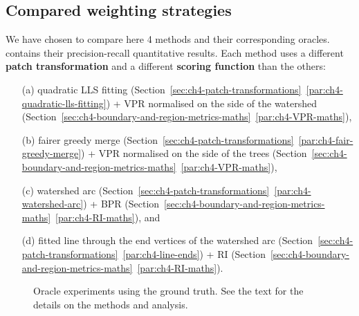 \subsection{Compared weighting strategies}
We have chosen to compare here 4 methods and their corresponding oracles.  contains their precision-recall quantitative results. Each method uses a different {\bf patch transformation} and a different {\bf scoring function} than the others: 
\begin{enumerate}
 \item[(a)] quadratic LLS fitting (Section~\ref*{sec:ch4-patch-transformations}~\ref{par:ch4-quadratic-lls-fitting}) + VPR normalised on the side of the watershed (Section~\ref*{sec:ch4-boundary-and-region-metrics-maths}~\ref{par:ch4-VPR-maths}),
 \item[(b)] fairer greedy merge (Section~\ref*{sec:ch4-patch-transformations}~\ref{par:ch4-fair-greedy-merge}) + VPR normalised on the side of the trees (Section~\ref*{sec:ch4-boundary-and-region-metrics-maths}~\ref{par:ch4-VPR-maths}),
 \item[(c)] watershed arc (Section~\ref*{sec:ch4-patch-transformations}~\ref{par:ch4-watershed-arc}) + BPR (Section~\ref*{sec:ch4-boundary-and-region-metrics-maths}~\ref{par:ch4-RI-maths}), and 
 \item[(d)] %
 fitted line through the end vertices of the watershed arc (Section~\ref*{sec:ch4-patch-transformations}~\ref{par:ch4-line-ends}) + RI (Section~\ref*{sec:ch4-boundary-and-region-metrics-maths}~\ref{par:ch4-RI-maths}).
\end{enumerate}

\begin{figure}[ht!]
\centering
\caption[Oracle experiments using the ground truth - plots]{Oracle experiments using the ground truth. See the text for the details on the methods and analysis.}
\label{fig:oracle}
\end{figure}


